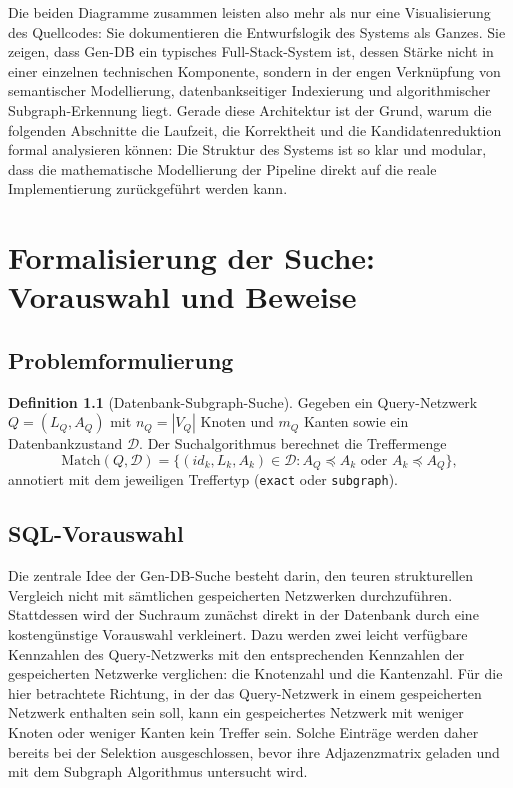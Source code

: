 \documentclass[a4paper,12pt, twoside]{report}
\theoremstyle{definition}
\newtheorem{definition}{Definition}
\begin{document}
Die beiden Diagramme zusammen leisten also mehr als nur eine Visualisierung des Quellcodes: Sie dokumentieren die Entwurfslogik des Systems als Ganzes. Sie zeigen, dass Gen-DB ein typisches Full-Stack-System ist, dessen Stärke nicht in einer einzelnen technischen Komponente, sondern in der engen Verknüpfung von semantischer Modellierung, datenbankseitiger Indexierung und algorithmischer Subgraph-Erkennung liegt. Gerade diese Architektur ist der Grund, warum die folgenden Abschnitte die Laufzeit, die Korrektheit und die Kandidatenreduktion formal analysieren können: Die Struktur des Systems ist so klar und modular, dass die mathematische Modellierung der Pipeline direkt auf die reale Implementierung zurückgeführt werden kann.


\chapter{Formalisierung der Suche: Vorauswahl und Beweise}
\label{sec:pipeline}

\section{Problemformulierung}

\begin{definition}[Datenbank-Subgraph-Suche]
	Gegeben ein Query-Netzwerk $Q = (L_Q, A_Q)$ mit $n_Q = |V_Q|$ Knoten und $m_Q$ Kanten sowie ein Datenbankzustand $\mathcal{D}$. Der Suchalgorithmus berechnet die Treffermenge
	\[
	\mathrm{Match}(Q, \mathcal{D}) = \{ (id_k, L_k, A_k) \in \mathcal{D} : A_Q \preceq A_k \text{ oder } A_k \preceq A_Q \},
	\]
	annotiert mit dem jeweiligen Treffertyp (\texttt{exact} oder \texttt{subgraph}).
\end{definition}

\section{SQL-Vorauswahl}
\label{sec:prefilter}

Die zentrale Idee der Gen-DB-Suche besteht darin, den teuren strukturellen Vergleich nicht mit sämtlichen gespeicherten Netzwerken durchzuführen. Stattdessen wird der Suchraum zunächst direkt in der Datenbank durch eine kostengünstige Vorauswahl verkleinert. Dazu werden zwei leicht verfügbare Kennzahlen des Query-Netzwerks mit den entsprechenden Kennzahlen der gespeicherten Netzwerke verglichen: die Knotenzahl und die Kantenzahl. Für die hier betrachtete Richtung, in der das Query-Netzwerk in einem gespeicherten Netzwerk enthalten sein soll, kann ein gespeichertes Netzwerk mit weniger Knoten oder weniger Kanten kein Treffer sein. Solche Einträge werden daher bereits bei der Selektion ausgeschlossen, bevor ihre Adjazenzmatrix geladen und mit dem Subgraph Algorithmus untersucht wird.
\end{document}
